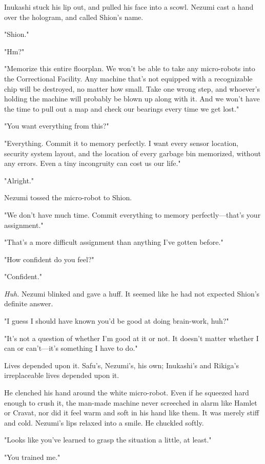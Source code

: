 Inukashi stuck his lip out, and pulled his face into a scowl. Nezumi
cast a hand over the hologram, and called Shion's name.

"Shion."

"Hm?"

"Memorize this entire floorplan. We won't be able to take any
micro-robots into the Correctional Facility. Any machine that's not
equipped with a recognizable chip will be destroyed, no matter how
small. Take one wrong step, and whoever's holding the machine will
probably be blown up along with it. And we won't have the time to pull
out a map and check our bearings every time we get lost."

"You want everything from this?"

"Everything. Commit it to memory perfectly. I want every sensor
location, security system layout, and the location of every garbage bin
memorized, without any errors. Even a tiny incongruity can cost us our
life."

"Alright."

Nezumi tossed the micro-robot to Shion.

"We don't have much time. Commit everything to memory perfectly---that's
your assignment."

"That's a more difficult assignment than anything I've gotten before."

"How confident do you feel?"

"Confident."

\emph{Huh.} Nezumi blinked and gave a huff. It seemed like he had not expected
Shion's definite answer.

"I guess I should have known you'd be good at doing brain-work, huh?"

"It's not a question of whether I'm good at it or not. It doesn't matter
whether I can or can't---it's something I have to do."

Lives depended upon it. Safu's, Nezumi's, his own; Inukashi's and
Rikiga's irreplaceable lives depended upon it.

He clenched his hand around the white micro-robot. Even if he squeezed
hard enough to crush it, the man-made machine never screeched in alarm
like Hamlet or Cravat, nor did it feel warm and soft in his hand like
them. It was merely stiff and cold. Nezumi's lips relaxed into a smile.
He chuckled softly.

"Looks like you've learned to grasp the situation a little, at least."

"You trained me."

